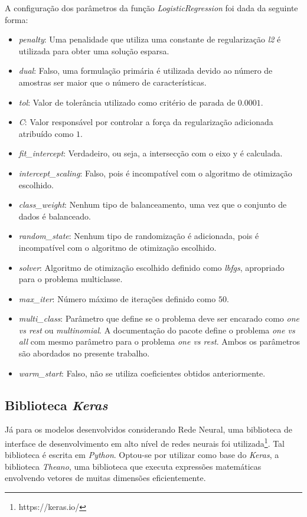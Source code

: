 \documentclass[conference]{IEEEtran}
\begin{document}
A configuração dos parâmetros da função \emph{LogisticRegression} foi dada da seguinte forma:
\begin{itemize}
	\item \textit{penalty}: Uma penalidade que utiliza uma constante de regularização \textit{l2} é utilizada para obter uma solução esparsa.
	\item \textit{dual}: Falso, uma formulação primária é utilizada devido ao número de amostras ser maior que o número de características.
	\item \textit{tol}: Valor de tolerância utilizado como critério de parada de $0.0001$.
	\item \textit{C}: Valor responsável por controlar a força da regularização adicionada atribuído como $1$.
	\item \textit{fit\_intercept}: Verdadeiro, ou seja, a intersecção com o eixo y é calculada.
	\item \textit{intercept\_scaling}: Falso, pois é incompatível com o algoritmo de otimização escolhido.
	\item \textit{class\_weight}: Nenhum tipo de balanceamento, uma vez que o conjunto de dados é balanceado.
	\item \textit{random\_state}: Nenhum tipo de randomização é adicionada, pois é incompatível com o algoritmo de otimização escolhido.
	\item \textit{solver}: Algoritmo de otimização escolhido definido como \textit{lbfgs}, apropriado para o problema multiclasse.
	\item \textit{max\_iter}: Número máximo de iterações definido como $50$.
	\item \textit{multi\_class}: Parâmetro que define se o problema deve ser encarado como \textit{one vs rest} ou \textit{multinomial}. A documentação do pacote define o problema \textit{one vs all} com mesmo parâmetro para o problema \textit{one vs rest}. Ambos os parâmetros são abordados no presente trabalho. 
	\item \textit{warm\_start}: Falso, não se utiliza coeficientes obtidos anteriormente.
\end{itemize}


\subsection{Biblioteca \textit{Keras}} \label{sec:bib}

Já para os modelos desenvolvidos considerando Rede Neural, uma biblioteca de interface de desenvolvimento em alto nível de redes neurais foi utilizada\footnote{https://keras.io/}. Tal biblioteca é escrita em \emph{Python}. Optou-se por utilizar como base do \textit{Keras}, a biblioteca \textit{Theano}, uma biblioteca que executa expressões matemáticas envolvendo vetores de muitas dimensões eficientemente.
\end{document}
